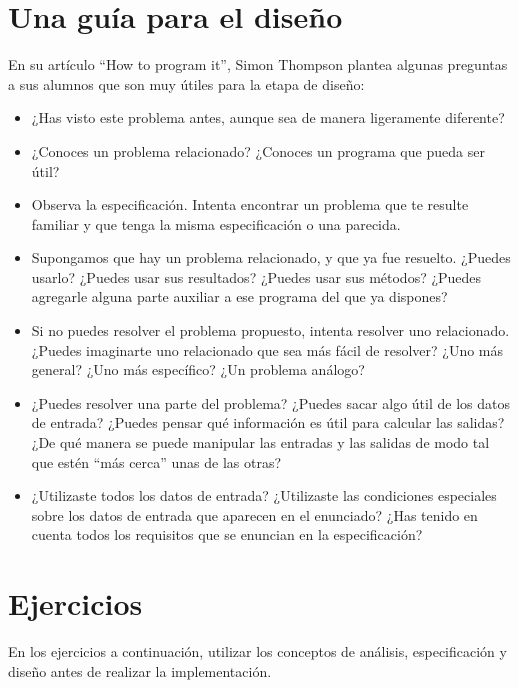 \section{Una guía para el diseño}

En su artículo ``How to program it'', Simon Thompson plantea
algunas preguntas a sus alumnos que son muy útiles para la etapa
de diseño:

\begin{itemize}
\item ¿Has visto este problema antes, aunque sea de manera
ligeramente diferente?

\item ¿Conoces un problema relacionado? ¿Conoces un programa que
pueda ser útil?

\item Observa la especificación. Intenta encontrar un
problema que te resulte familiar y que tenga la misma
especificación o una parecida.

\item Supongamos que hay un problema relacionado, y que ya fue
resuelto. ¿Puedes usarlo? ¿Puedes usar sus resultados?  ¿Puedes usar sus
métodos? ¿Puedes agregarle alguna parte auxiliar a ese programa del que ya
dispones?

\item Si no puedes resolver el problema propuesto, intenta
resolver uno relacionado. ¿Puedes imaginarte uno relacionado que
sea más fácil de resolver? ¿Uno más general? ¿Uno más específico?
¿Un problema análogo?

\item ¿Puedes resolver una parte del problema?  ¿Puedes sacar algo
útil de los datos de entrada? ¿Puedes pensar qué información es
útil para calcular las salidas? ¿De qué manera se puede manipular
las entradas y las salidas de modo tal que estén ``más cerca''
unas de las otras?

\item ¿Utilizaste todos los datos de entrada? ¿Utilizaste las condiciones
especiales sobre los datos de entrada que aparecen en el
enunciado? ¿Has tenido en cuenta todos los requisitos que se
enuncian en la especificación?

\end{itemize}

\newpage
\section{Ejercicios}

\begin{extract*}
En los ejercicios a continuación, utilizar los conceptos de análisis,
especificación y diseño antes de realizar la implementación.
\end{extract*}

